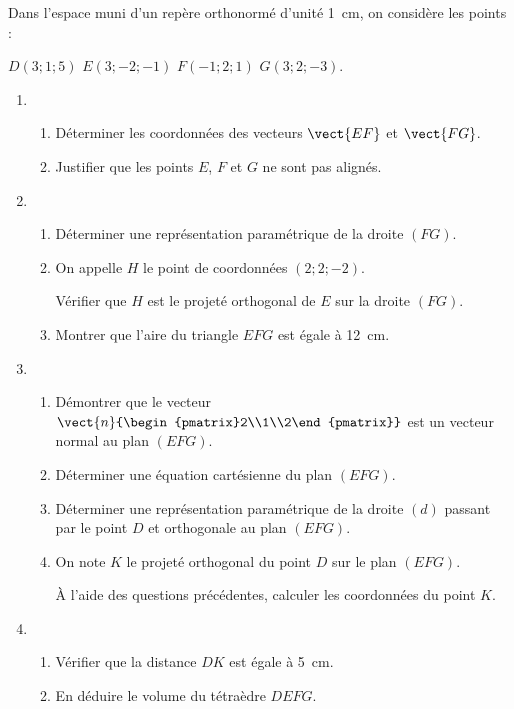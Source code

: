 Dans l'espace muni d'un repère orthonormé d'unité 1~cm, on considère les points :

\smallskip

\hfill$D(3;1;5)$ \quad $E(3;-2;-1)$ \quad $F(-1;2;1)$ \quad $G(3;2;-3)$.\hfill~

\begin{enumerate}
	\item 
	\begin{enumerate}
		\item Déterminer les coordonnées des vecteurs $\vect{EF}$ et $\vect{FG}$.
		\item Justifier que les points $E$, $F$ et $G$ ne sont pas alignés.
	\end{enumerate}
	\item 
	\begin{enumerate}
		\item Déterminer une représentation paramétrique de la droite $(FG)$.
		\item On appelle $H$ le point de coordonnées $(2;2;-2)$.
		
		Vérifier que $H$ est le projeté orthogonal de $E$ sur la droite $(FG)$.
		\item Montrer que l'aire du triangle $EFG$ est égale à 12~cm.
	\end{enumerate}
	\item 
	\begin{enumerate}
		\item Démontrer que le vecteur $\vect{n}{\begin{pmatrix}2\\1\\2\end{pmatrix}}$ est un vecteur normal au plan $(EFG)$.
		\item Déterminer une équation cartésienne du plan $(EFG)$.
		\item Déterminer une représentation paramétrique de la droite $(d)$ passant par le point $D$ et orthogonale au plan $(EFG)$.
		\item On note $K$ le projeté orthogonal du point $D$ sur le plan $(EFG)$.
		
		À l'aide des questions précédentes, calculer les coordonnées du point $K$.
	\end{enumerate}
	\item 
	\begin{enumerate}
		\item Vérifier que la distance $DK$ est égale à 5~cm.
		\item En déduire le volume du tétraèdre $DEFG$.
	\end{enumerate}
\end{enumerate}